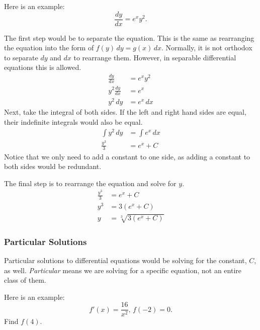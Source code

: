 \documentclass[12pt]{article}
\begin{document}
                \noindent Here is an example:
                \[ \frac{dy}{dx} = e^x y^2. \]

                The first step would be to separate the equation. This is the same as rearranging the equation into the form of $f(y) \, dy = g(x) \, dx$. Normally, it is not orthodox to separate $dy$ and $dx$ to rearrange them. However, in separable differential equations this is allowed.
                \begin{align*}
                    \frac{dy}{dx} &= e^x y^2 \\[6pt]
                    y^2 \frac{dy}{dx} &= e^x \\[6pt]
                    y^2 \, dy &= e^x \, dx
                \end{align*}
                Next, take the integral of both sides. If the left and right hand sides are equal, their indefinite integrals would also be equal.
                \begin{align*}
                    \int y^2 \, dy &= \int e^x \, dx \\
                    \frac{y^3}{3} &= e^x + C
                \end{align*}
                Notice that we only need to add a constant to one side, as adding a constant to both sides would be redundant.

                \noindent The final step is to rearrange the equation and solve for $y$.
                \begin{align*}
                    \frac{y^3}{3} &= e^x + C \\[6pt]
                    y^3 &= 3 \left( e^x + C \right) \\
                    y &= \sqrt[3]{3 \left( e^x + C \right)}
                \end{align*}

            \subsubsection{Particular Solutions}
                Particular solutions to differential equations would be solving for the constant, $C$, as well. \textit{Particular} means we are solving for a specific equation, not an entire class of them.

                \noindent Here is an example:
                \[ f'(x) = \frac{16}{x^2}, \, f(-2) = 0. \]
                Find $f(4)$.
\end{document}
